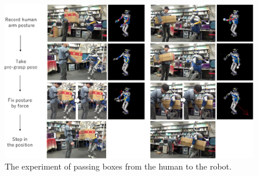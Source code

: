 \begin{figure}[htbp]
  \begin{center}
    \includegraphics[width=1.00\columnwidth]{figs/passing_ex2}
    \caption{The experiment of passing boxes from the human to the robot.}
    \label{figure:passing}
  \end{center}
\end{figure}

